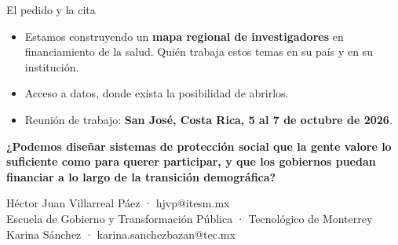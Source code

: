 \documentclass[aspectratio=169,11pt]{beamer}
\newcommand{\clave}[1]{\textcolor{acento}{\textbf{#1}}}
\begin{document}
\begin{frame}{El pedido y la cita}
  \begin{itemize}
    \item Estamos construyendo un \clave{mapa regional de investigadores} en financiamiento de la salud. Quién trabaja estos temas en su país y en su institución.
    \item Acceso a datos, donde exista la posibilidad de abrirlos.
    \item Reunión de trabajo: \clave{San José, Costa Rica, 5 al 7 de octubre de 2026}.
  \end{itemize}
\end{frame}

\begin{frame}[plain]
  \vfill
  \begin{center}
    \colorbox{banda}{\parbox{0.90\textwidth}{\vspace{1.0em}\centering
      \large\textbf{\textcolor{acento}{¿Podemos diseñar sistemas de protección social que la gente valore lo suficiente como para querer participar, y que los gobiernos puedan financiar a lo largo de la transición demográfica?}}
      \vspace{1.0em}}}
  \end{center}
  \vfill
  \begin{center}\small
    Héctor Juan Villarreal Páez · hjvp@itesm.mx\\
    Escuela de Gobierno y Transformación Pública · Tecnológico de Monterrey\\
    Karina Sánchez · karina.sanchezbazan@tec.mx
  \end{center}
  \vfill
\end{frame}

\end{document}
